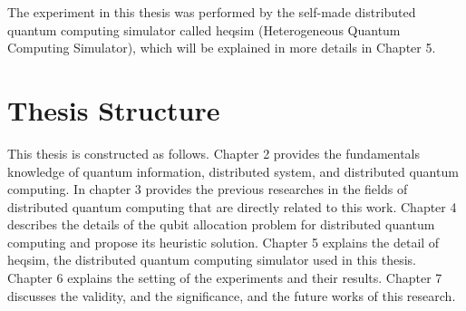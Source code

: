 The experiment in this thesis was performed by the self-made distributed quantum computing simulator called heqsim (Heterogeneous Quantum Computing Simulator), which will be explained in more details in Chapter 5.

\section{Thesis Structure}
\label{introduction:thesis_structure}
This thesis is constructed as follows. Chapter 2 provides the fundamentals knowledge of quantum information, distributed system, and distributed quantum computing. In chapter 3 provides the previous researches in the fields of distributed quantum computing that are directly related to this work. Chapter 4 describes the details of the qubit allocation problem for distributed quantum computing and propose its heuristic solution. Chapter 5 explains the detail of heqsim, the distributed quantum computing simulator used in this thesis. Chapter 6 explains the setting of the experiments and their results. Chapter 7 discusses the validity, and the significance, and the future works of this research.


